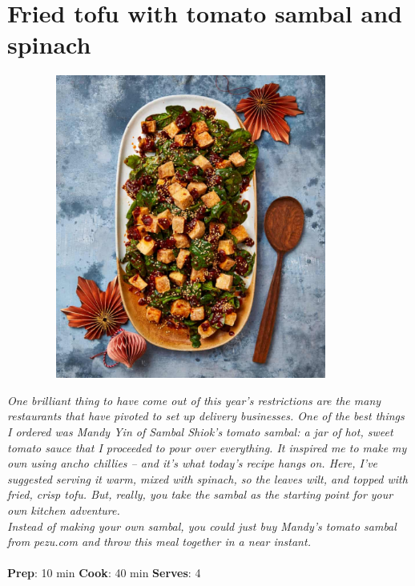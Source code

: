 \documentclass{book}
\begin{document}
\section{Fried tofu with tomato sambal and spinach}
\begin{figure}
\centering\includegraphics[width=10cm,height=10cm,keepaspectratio]{Recipe_Pictures/Fried_tofu_with_tomato_sambal_and_spinach.png}
\end{figure}
\emph{One brilliant thing to have come out of this year’s restrictions are the many restaurants that have pivoted to set up delivery businesses. One of the best things I ordered was Mandy Yin of Sambal Shiok’s tomato sambal: a jar of hot, sweet tomato sauce that I proceeded to pour over everything. It inspired me to make my own using ancho chillies – and it’s what today’s recipe hangs on. Here, I’ve suggested serving it warm, mixed with spinach, so the leaves wilt, and topped with fried, crisp tofu. But, really, you take the sambal as the starting point for your own kitchen adventure.\\ 
Instead of making your own sambal, you could just buy Mandy’s tomato sambal from pezu.com and throw this meal together in a near instant.}\\\\ 
\textbf{Prep}: 10 min
\textbf{Cook}: 40 min
\textbf{Serves}: 4
\end{document}
